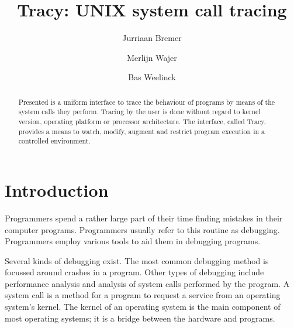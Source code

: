 \documentclass[a4paper, 10pt]{report}
\author{Jurriaan Bremer \and Merlijn Wajer \and Bas Weelinck}
\title{Tracy: UNIX system call tracing}
\begin{document}
\maketitle

\nocite{*}


\begin{abstract}
Presented is a uniform interface to trace the behaviour of programs
by means of the system calls they perform. Tracing by the user is done without
regard to kernel version, operating platform or processor architecture.
The interface, called Tracy, provides a means to watch, modify, augment
and restrict program execution in a controlled environment.
\end{abstract}

\tableofcontents

%
%
%

\chapter{Introduction}

Programmers spend a rather large part of their time finding mistakes in their
computer programs. Programmers usually refer to this routine as debugging.
Programmers employ various tools to aid them in debugging programs.

Several kinds of debugging exist. The most common debugging method is
focussed around crashes in a program. Other types of debugging include
performance analysis and analysis of system calls performed by the program.
A system call is a method for a program to request a service from an operating
system's kernel. The kernel of an operating system is the main component
of most operating systems; it is a bridge between the hardware and programs.
\end{document}

